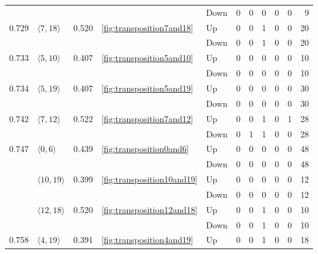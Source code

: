 \documentclass{article}
\begin{document}
\begin{center}
\begin{tabular}{lllllrrrrrr}
 &  &  &  & Down & 0 & 0 & 0 & 0 & 0 & 9 \\
\cline{1-11} \cline{2-11} \cline{3-11} \cline{4-11}
\multirow[t]{2}{*}{0.729} & \multirow[t]{2}{*}{$\langle7, 18\rangle$} & \multirow[t]{2}{*}{0.520} & \multirow[t]{2}{*}{\ref{fig:transposition7and18}} & Up & 0 & 0 & 1 & 0 & 0 & 20 \\
 &  &  &  & Down & 0 & 0 & 1 & 0 & 0 & 20 \\
\cline{1-11} \cline{2-11} \cline{3-11} \cline{4-11}
\multirow[t]{2}{*}{0.733} & \multirow[t]{2}{*}{$\langle5, 10\rangle$} & \multirow[t]{2}{*}{0.407} & \multirow[t]{2}{*}{\ref{fig:transposition5and10}} & Up & 0 & 0 & 0 & 0 & 0 & 10 \\
 &  &  &  & Down & 0 & 0 & 0 & 0 & 0 & 10 \\
\cline{1-11} \cline{2-11} \cline{3-11} \cline{4-11}
\multirow[t]{2}{*}{0.734} & \multirow[t]{2}{*}{$\langle5, 19\rangle$} & \multirow[t]{2}{*}{0.407} & \multirow[t]{2}{*}{\ref{fig:transposition5and19}} & Up & 0 & 0 & 0 & 0 & 0 & 30 \\
 &  &  &  & Down & 0 & 0 & 0 & 0 & 0 & 30 \\
\cline{1-11} \cline{2-11} \cline{3-11} \cline{4-11}
\multirow[t]{2}{*}{0.742} & \multirow[t]{2}{*}{$\langle7, 12\rangle$} & \multirow[t]{2}{*}{0.522} & \multirow[t]{2}{*}{\ref{fig:transposition7and12}} & Up & 0 & 0 & 1 & 0 & 1 & 28 \\
 &  &  &  & Down & 0 & 1 & 1 & 0 & 0 & 28 \\
\cline{1-11} \cline{2-11} \cline{3-11} \cline{4-11}
\multirow[t]{6}{*}{0.747} & \multirow[t]{2}{*}{$\langle0, 6\rangle$} & \multirow[t]{2}{*}{0.439} & \multirow[t]{2}{*}{\ref{fig:transposition0and6}} & Up & 0 & 0 & 0 & 0 & 0 & 48 \\
 &  &  &  & Down & 0 & 0 & 0 & 0 & 0 & 48 \\
\cline{2-11} \cline{3-11} \cline{4-11}
 & \multirow[t]{2}{*}{$\langle10, 19\rangle$} & \multirow[t]{2}{*}{0.399} & \multirow[t]{2}{*}{\ref{fig:transposition10and19}} & Up & 0 & 0 & 0 & 0 & 0 & 12 \\
 &  &  &  & Down & 0 & 0 & 0 & 0 & 0 & 12 \\
\cline{2-11} \cline{3-11} \cline{4-11}
 & \multirow[t]{2}{*}{$\langle12, 18\rangle$} & \multirow[t]{2}{*}{0.520} & \multirow[t]{2}{*}{\ref{fig:transposition12and18}} & Up & 0 & 0 & 1 & 0 & 0 & 10 \\
 &  &  &  & Down & 0 & 0 & 1 & 0 & 0 & 10 \\
\cline{1-11} \cline{2-11} \cline{3-11} \cline{4-11}
\multirow[t]{2}{*}{0.758} & \multirow[t]{2}{*}{$\langle4, 19\rangle$} & \multirow[t]{2}{*}{0.391} & \multirow[t]{2}{*}{\ref{fig:transposition4and19}} & Up & 0 & 0 & 1 & 0 & 0 & 18 \\

\end{tabular}
\end{center}
\end{document}
